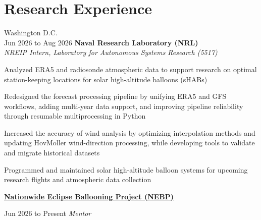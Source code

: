 \section{Research Experience}

	\begin{twocolentry}{Washington D.C. \\ Jun 2026 to Aug 2026}
        \textbf{Naval Research Laboratory (NRL)}\\
        \textit{NREIP Intern, Laboratory for Autonomous Systems Research (5517)}
    \end{twocolentry}

    \vspace{0.10 cm}
    \begin{onecolentry}
        \begin{highlights}
        	\item Analyzed ERA5 and radiosonde atmospheric data to support research on optimal station-keeping locations for solar high-altitude balloons (sHABs)
        	\item Redesigned the forecast processing pipeline by unifying ERA5 and GFS workflows, adding multi-year data support, and improving pipeline reliability through resumable multiprocessing in Python
        	\item Increased the accuracy of wind analysis by optimizing interpolation methods and updating HovMoller wind-direction processing, while developing tools to validate and migrate historical datasets
        	\item Programmed and maintained solar high-altitude balloon systems for upcoming research flights and atmospheric data collection
        \end{highlights}
    \end{onecolentry}  
    
    \vspace{0.20 cm}

    \begin{twocolentry}{}
        \href{http://eclipse.montana.edu/}{\textbf{Nationwide Eclipse Ballooning Project (NEBP)}}
    \end{twocolentry}

    \vspace{0.10 cm}

    \begin{twocolentry}{Jun 2026 to Present}
        \textit{Mentor}
    \end{twocolentry}

